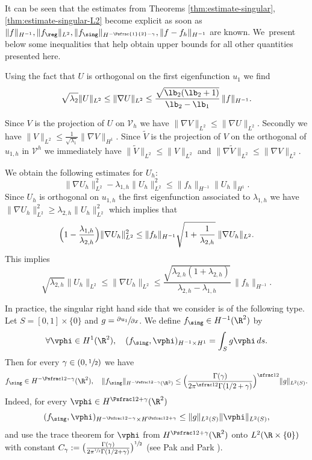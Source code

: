 \begin{rem}
\rm
It can be seen that the estimates from Theorems \ref{thm:estimate-singular}, \ref{thm:estimate-singular-L2} become explicit as soon as $\|f\|_{H^{-1}}, \|f_{\reg}\|_{L^2}, \|f_{\sing}\|_{H^{-\Psfrac{1}{2}-\gamma}}, \|f-f_h\|_{H^{-1}}$ are known. We~present below some inequalities that help obtain upper bounds for all other quantities presented here.

Using the fact that $U$ is orthogonal on the first eigenfunction $u_1$ we find
\[
\sqrt{\lambda_2}\|U\|_{L^2}\le \|\nabla U\|_{L^2}\le \frac{\sqrt{\lb_2(\lb_2+1)}}{\lb_2-\lb_1}\,\|f\|_{H^{-1}}.
\]

Since $V$ is the projection of $U$ on $\mathcal V_h$ we have $\|\nabla V\|_{L^2} \leq \|\nabla U\|_{L^2}$. Secondly we have $\|V\|_{L^2} \leq \frac{1}{\sqrt{\lambda_1}} \|\nabla V\|_{H^1}$. Since $\tilde V$ is the projection of $V$ on the orthogonal of $u_{1,h}$ in $\mathcal V^h$ we immediately have $\|\tilde V\|_{L^2} \leq \|V\|_{L^2}$ and $\|\nabla \tilde V\|_{L^2} \leq \|\nabla V\|_{L^2}$.

We obtain the following estimates for $U_h$:
\[
\|\nabla U_h\|^2_{L^2}-\lambda_{1,h} \|U_h\|_{L^2}^2 \leq \|f_h\|_{H^{-1}}\|U_h\|_{H^1}.
\]
Since $U_h$ is orthogonal on $u_{1,h}$ the first eigenfunction associated to $\lambda_{1,h}$ we have $\|\nabla U_h\|_{L^2}^2 \geq \lambda_{2,h} \|U_h\|_{L^2}^2$ which implies that
\[
\Bigl(1-\frac{\lambda_{1,h}}{\lambda_{2,h}}\Bigr) \|\nabla U_h\|^2_{L^2} \leq \|f_h\|_{H^{-1}} \sqrt{1+\frac{1}{\lambda_{2,h}}}\; \|\nabla U_h\|_{L^2}.
\]
This implies
\[
\sqrt{\lambda_{2,h}}\|U_h\|_{L^2} \leq \|\nabla U_h\|_{L^2} \leq \frac{\sqrt{\lambda_{2,h}(1+\lambda_{2,h})}}{\lambda_{2,h}-\lambda_{1,h}}\, \|f_h\|_{H^{-1}}.
\]
\label{rem:needed-estimates}
\end{rem}

\begin{rem}
In practice, the singular right hand side that we consider is of the following type. Let $S= [0, 1]\times \{0\}$ and $g= \sfrac{\partial u_1}{\partial x} $. We define $f_{\sing}\in H^{-1}(\R^2)$ by
\[
\forall \vphi \in H^1(\R^2),\quad (f _{\sing}, \vphi)_{H^{-1}\times H^1} = \int_S g \vphi\, ds.
\]
Then for every $\gamma \in (0, \sfrac 12)$ we have
\[
f_{\sing} \in H^{-\Psfrac 12 -\gamma} (\R^2), \quad \|f_{\sing}\|_{H^{-\Psfrac 12 -\gamma} (\R^2)} \le
\Bigl (\frac{\Gamma(\gamma)}{2\pi^{\sfrac 12} \Gamma(1/2+\gamma)}\Bigr)^{\sfrac 12} \|g\|_{L^2(S)}.
\]
Indeed, for every $\vphi\in H^{\Psfrac 12 +\gamma} (\R^2)$
\[
(f_{\sing}, \vphi)_{H^{-\Psfrac 12-\gamma}\times H^{\Psfrac 12 +\gamma}}\le \|g\|_{L^2(S)} \|\vphi\|_{L^2(S)},
\]
and use the trace theorem for $\vphi$ from
$H^{\Psfrac 12 +\gamma} (\R^2)$ onto $L^2(\R\times\{0\})$ with constant $C_\gamma := \big (\frac{\Gamma(\gamma)}{2\pi^{\sfrac 12} \Gamma(1/2+\gamma)}\big)^{\sfrac 12}$ (see Pak and Park \cite{PaPa11}).
\label{rem:c-gamma}
\end{rem}

